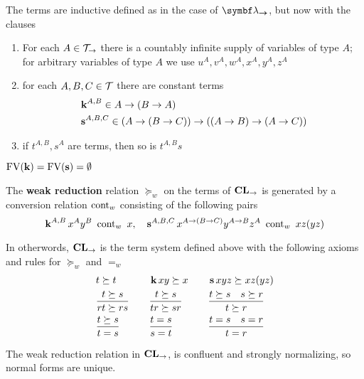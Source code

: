 \documentclass[11pt]{article}
\begin{document}
\begin{definition}
The terms are inductive defined as in the case of \(\blambda_{\bto}\), but now with
the clauses
\begin{enumerate}
\item For each \(A\in\mathcal{T}_\to\) there is a countably infinite supply of variables
of type \(A\); for arbitrary variables of type \(A\) we use
\(u^A,v^A,w^A,x^A,y^A,z^A\)
\item for each \(A,B,C\in\mathcal{T}\) there are constant terms
\begin{align*}
&\operatorname{\textbf{k}}^{A,B}\in A\to(B\to A)\\
&\operatorname{\textbf{s}}^{A,B,C}\in (A\to(B\to C))\to((A\to B)\to(A\to C))
\end{align*}
\item if \(t^{A,B},s^A\) are terms, then so is \(t^{A,B}s\)
\end{enumerate}


\(\text{FV}(\operatorname{\textbf{k}})=\text{FV}(\operatorname{\textbf{s}})=\emptyset\)
\end{definition}

\begin{definition}[]
The \textbf{weak reduction} relation \(\succeq_w\) on the terms of \(\operatorname{\textbf{CL}}_\to\) is
generated by a conversion relation \(\text{cont}_w\) consisting of the following
pairs
\begin{equation*}
\operatorname{\textbf{k}}^{A,B}x^Ay^B\enspace\text{cont}_w\enspace x,\quad\operatorname{\textbf{s}}^{A,B,C}x^{A\to(B\to C)}y^{A\to B}z^A
\enspace\text{cont}_w\enspace xz(yz)
\end{equation*}

In otherwords, \(\operatorname{\textbf{CL}}_\to\) is the term system defined above with the following
axioms and rules for \(\succeq_w\) and \(=_w\)
\begin{alignat*}{3}
&t\succeq t&&\operatorname{\textbf{k}} xy\succeq x\quad&&\operatorname{\textbf{s}} xyz\succeq xz(yz)\\
&\frac{t\succeq s}{rt\succeq rs}\quad&&\frac{t\succeq s}{tr\succeq sr}&&
\frac{t\succeq s\quad s\succeq r}{t\succeq r}\\
&\frac{t\succeq s}{t=s}&&\frac{t=s}{s=t}&&\frac{t=s\quad s=r}{t=r}
\end{alignat*}
\end{definition}

\begin{theorem}[]
The weak reduction relation in \(\operatorname{\textbf{CL}}_\to\), is confluent and
strongly normalizing, so normal forms are unique.
\end{theorem}
\end{document}

